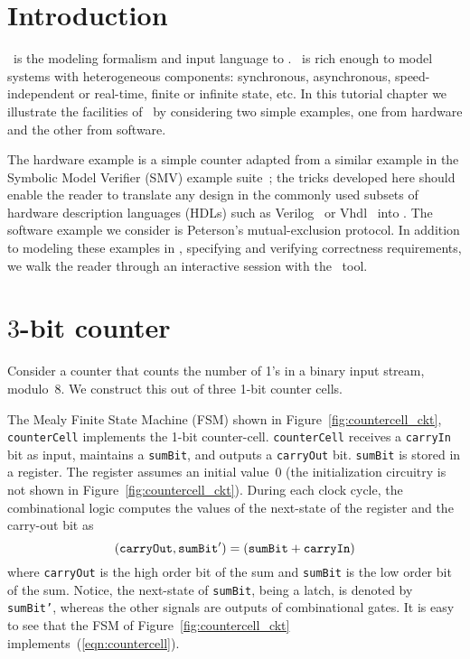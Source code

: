 \label{chap:tut}
\section{Introduction}

\intfs\ is the modeling formalism and input language to \chai. \intfs\ is rich
enough to model systems with heterogeneous components: synchronous,
asynchronous, speed-independent or real-time, finite or infinite
state, etc. In this tutorial chapter we illustrate the facilities of \chai\
by considering two simple examples, one from hardware and the other
from software. 

The hardware example is a simple counter adapted from a
similar example in the Symbolic Model Verifier ({\sc SMV}) example suite~\cite{};
the tricks developed here should enable the reader to translate any design in the commonly
used subsets of hardware description languages (HDLs) such as
{\sc Verilog}~\cite{} or {\sc Vhdl}~\cite{} into \rem. 
The software example we consider is Peterson's mutual-exclusion
protocol. In addition to modeling these examples in \rem, specifying and verifying correctness
requirements, we walk the reader through an interactive session with
the \chai\ tool.

\section{$3$-bit counter}
Consider a counter that counts the number of 1's in a binary
input stream, modulo~8. We construct this out of three 1-bit
counter cells. 


The Mealy Finite State Machine (FSM)
shown in Figure~\ref{fig:countercell_ckt}, {\tt counterCell} implements the
1-bit counter-cell.  {\tt counterCell} receives a {\tt carryIn} bit as
input, maintains a {\tt sumBit}, and outputs a {\tt carryOut}
bit. {\tt sumBit} is
stored in a register. The register assumes an initial value~$0$ (the
initialization circuitry is not shown in Figure~\ref{fig:countercell_ckt}).
During each clock cycle, the combinational
logic computes the values of the next-state of the register and the
carry-out bit as 
\begin{equation}
\label{eqn:countercell}
{\tt (carryOut, sumBit') = (sumBit + carryIn) }
\end{equation}
where {\tt carryOut} is the high order bit of the sum and {\tt sumBit} is the low order
bit of the sum. Notice, the next-state of {\tt sumBit}, being a latch, is
denoted by {\tt sumBit'}, whereas the other signals are outputs of
combinational gates. It is easy to see that the FSM of Figure~\ref{fig:countercell_ckt}
implements~(\ref{eqn:countercell}). 

